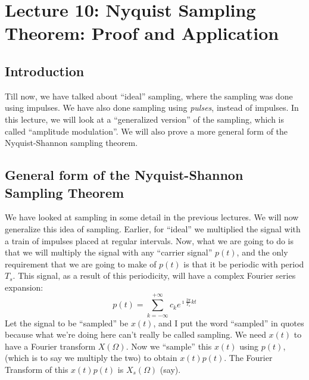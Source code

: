 \section{Lecture 10: Nyquist Sampling Theorem: Proof and Application}

\subsection{Introduction}
Till now, we have talked about ``ideal'' sampling, where the sampling was done using impulses. We have also done sampling using \emph{pulses}, instead of impulses. In this lecture, we will look at a ``generalized version'' of the sampling, which is called ``amplitude modulation''.  We will also prove a more general form of the Nyquist-Shannon sampling theorem.



\subsection{General form of the Nyquist-Shannon Sampling Theorem}
We have looked at sampling in some detail in the previous lectures. We will now generalize this idea of sampling. Earlier, for ``ideal'' we multiplied the signal with a train of impulses placed at regular intervals. Now, what we are going to do is that we will multiply the signal with any ``carrier signal'' $p(t)$, and the only requirement that we are going to make of $p(t)$ is that it be periodic with period $T_s$. This signal, as a result of this periodicity, will have a complex Fourier series expansion:
\[ p(t) = \sum\limits_{k=-\infty}^{+\infty} c_k e^{\imath\frac{2\pi}{T_s}kt}\]
Let the signal to be ``sampled'' be $x(t)$, and I put the word ``sampled'' in quotes because what we're doing here can't really be called sampling. We need $x(t)$ to have a Fourier transform $X(\Omega)$. Now we ``sample'' this $x(t)$ using $p(t)$, (which is to say we multiply the two) to obtain $x(t) p(t)$. The Fourier Transform of this $x(t) p(t)$ is $X_s(\Omega)$ (say).

